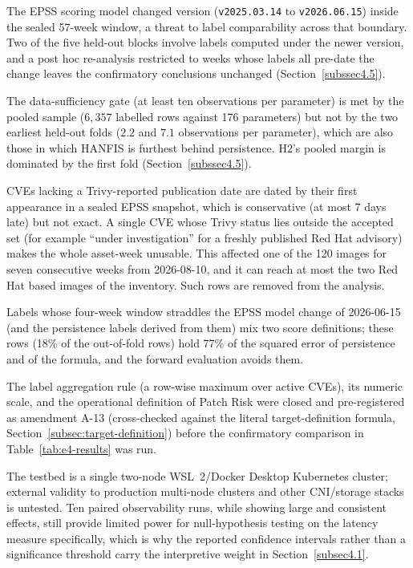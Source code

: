 \documentclass[pdflatex,sn-basic]{sn-jnl}
\theoremstyle{thmstyleone}%
\theoremstyle{thmstyletwo}%
\theoremstyle{thmstylethree}%
\begin{document}
The EPSS scoring model changed version (\texttt{v2025.03.14} to
\texttt{v2026.06.15}) inside the sealed 57-week window, a threat to label comparability across that boundary. Two of the five held-out blocks involve labels computed under the newer version, and a post hoc
re-analysis restricted to weeks whose labels all pre-date the change leaves the confirmatory conclusions
unchanged (Section~\ref{subssec4.5}).

The data-sufficiency gate (at least ten observations per parameter) is met by the pooled
sample ($6{,}357$ labelled rows against 176 parameters) but not by the two earliest held-out folds ($2.2$ and $7.1$ observations per
parameter), which are also those in which HANFIS is furthest behind persistence. H2's pooled margin is dominated by the
first fold (Section~\ref{subssec4.5}).

CVEs lacking a Trivy-reported publication date are
dated by their first appearance in a sealed EPSS snapshot, which is conservative (at most 7 days late) but not exact. A single CVE whose Trivy status lies outside the accepted set (for example ``under investigation'' for a freshly published Red Hat advisory) makes the whole asset-week unusable. This affected one of the 120 images for seven consecutive weeks from 2026-08-10, and it can reach at most the two Red Hat based images of the inventory. Such rows are removed from the analysis.

Labels whose four-week window straddles the EPSS model change of 2026-06-15 (and the persistence labels derived from them) mix two score definitions; these rows (18\% of the out-of-fold rows) hold 77\% of the squared error of persistence and of the formula, and the forward evaluation avoids them.

The label aggregation rule (a row-wise maximum over active CVEs), its numeric scale, and
the operational definition of Patch Risk were closed and pre-registered as amendment A-13
(cross-checked against the literal target-definition formula, Section~\ref{subsec:target-definition})
before the confirmatory comparison in Table~\ref{tab:e4-results} was run.

The testbed is a
single two-node WSL~2/Docker Desktop Kubernetes cluster; external validity to production multi-node
clusters and other CNI/storage stacks is untested. Ten paired observability runs, while showing large
and consistent effects, still provide limited power for null-hypothesis testing on the latency measure
specifically, which is why the reported confidence intervals rather than a significance threshold carry
the interpretive weight in Section~\ref{subsec4.1}.
\end{document}
